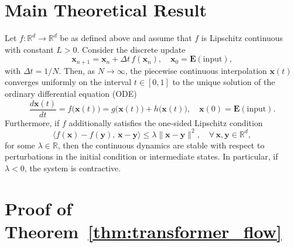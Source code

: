 
\section{Main Theoretical Result}

\begin{theorem}
\label{thm:transformer_flow}
Let $f:\mathbb{R}^d \to \mathbb{R}^d$ be as defined above and assume that $f$ is Lipschitz continuous with constant $L>0$. Consider the discrete update
\[
\mathbf{x}_{n+1} = \mathbf{x}_n + \Delta t\, f(\mathbf{x}_n), \quad \mathbf{x}_0 = \mathbf{E}(\text{input}),
\]
with $\Delta t = 1/N$. Then, as $N \to \infty$, the piecewise continuous interpolation $\mathbf{x}(t)$ converges uniformly on the interval $t \in [0,1]$ to the unique solution of the ordinary differential equation (ODE)
\[
\frac{d\mathbf{x}(t)}{dt} = f\bigl(\mathbf{x}(t)\bigr) = g\bigl(\mathbf{x}(t)\bigr) + h\bigl(\mathbf{x}(t)\bigr), \quad \mathbf{x}(0)= \mathbf{E}(\text{input}).
\]
Furthermore, if $f$ additionally satisfies the one-sided Lipschitz condition
\[
\langle f(\mathbf{x}) - f(\mathbf{y}),\, \mathbf{x} - \mathbf{y} \rangle \le \lambda \|\mathbf{x} - \mathbf{y}\|^2, \quad \forall\, \mathbf{x},\mathbf{y}\in \mathbb{R}^d,
\]
for some $\lambda \in \mathbb{R}$, then the continuous dynamics are stable with respect to perturbations in the initial condition or intermediate states. In particular, if $\lambda < 0$, the system is contractive.
\end{theorem}


\section{Proof of Theorem~\ref{thm:transformer_flow}}

